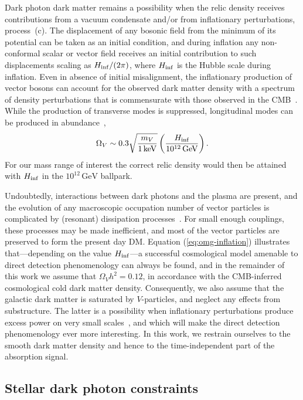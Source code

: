 \documentclass[prd,reprint,nofootinbib,notitlepage,aps,tightenlines,preprintnumbers,amsmath,amssymb,showpacs,superscriptaddress]{revtex4-1}
\newcommand{\keV}{\ensuremath{\mathrm{keV}}}
\newcommand{\GeV}{\ensuremath{\mathrm{GeV}}}
\begin{document}
Dark photon dark matter remains a possibility when the relic density
receives contributions from a vacuum condensate and/or from
inflationary perturbations, process~(c). The displacement of any
bosonic field from the minimum of its potential can be taken as an
initial condition, and during inflation any non-conformal scalar or
vector field receives an initial contribution to such displacements
scaling as $H_{\rm inf}/(2 \pi)$, where $H_{\rm inf}$ is the Hubble
scale during inflation.
%
Even in absence of initial misalignment, the inflationary production
of vector bosons can account for the observed dark matter density with
a spectrum of density perturbations that is commensurate with those
observed in the CMB~\cite{Graham:2015rva}.  While the production of
transverse modes is suppressed, longitudinal modes can be produced in
abundance~\cite{Graham:2015rva},
%
\begin{align}
 \label{eq:omg-inflation}
  \Omega_V  \sim 0.3 \sqrt{\frac{m_V}{1\,\keV}} 
  \left( \frac{H_{\rm inf}}{10^{12}\,\GeV} \right) .
\end{align}
%
For our mass range of interest the correct relic density would then be
attained with $H_{\rm inf}$ in the $10^{12}\,\GeV$ ballpark.

Undoubtedly, interactions between dark photons and the plasma are
present, and the evolution of any macroscopic occupation number of
vector particles is complicated by (resonant) dissipation
processes~\cite{Arias:2012az}.  For small enough couplings, these
processes may be made inefficient, and most of the vector particles
are preserved to form the present day DM. Equation
(\ref{eq:omg-inflation}) illustrates that---depending on the value
$H_{\rm inf}$---a successful cosmological model amenable to direct
detection phenomenology can always be found, and in the remainder of
this work we assume that $ \Omega_V h^2 = 0.12$, in accordance with
the CMB-inferred cosmological cold dark matter density. Consequently,
we also assume that the galactic dark matter is saturated by
$V$-particles, and neglect any effects from substructure. The latter
is a possibility when inflationary perturbations produce excess power
on very small scales~\cite{Graham:2015rva}, and which will make the
direct detection phenomenology ever more interesting. In this work, we
restrain ourselves to the smooth dark matter density and hence to the
time-independent part of the absorption signal.


\subsection{Stellar dark photon constraints}
\end{document}
